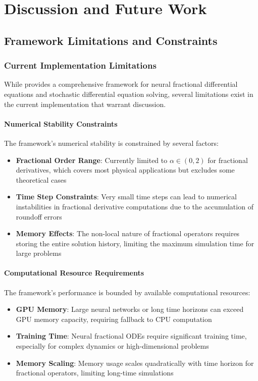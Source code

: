 \section{Discussion and Future Work}

\subsection{Framework Limitations and Constraints}

\subsubsection{Current Implementation Limitations}

While \hpfracc provides a comprehensive framework for neural fractional differential equations and stochastic differential equation solving, several limitations exist in the current implementation that warrant discussion.

\paragraph{Numerical Stability Constraints}
The framework's numerical stability is constrained by several factors:

\begin{itemize}
    \item \textbf{Fractional Order Range}: Currently limited to $\alpha \in (0, 2)$ for fractional derivatives, which covers most physical applications but excludes some theoretical cases
    \item \textbf{Time Step Constraints}: Very small time steps can lead to numerical instabilities in fractional derivative computations due to the accumulation of roundoff errors
    \item \textbf{Memory Effects}: The non-local nature of fractional operators requires storing the entire solution history, limiting the maximum simulation time for large problems
\end{itemize}

\paragraph{Computational Resource Requirements}
The framework's performance is bounded by available computational resources:

\begin{itemize}
    \item \textbf{GPU Memory}: Large neural networks or long time horizons can exceed GPU memory capacity, requiring fallback to CPU computation
    \item \textbf{Training Time}: Neural fractional ODEs require significant training time, especially for complex dynamics or high-dimensional problems
    \item \textbf{Memory Scaling}: Memory usage scales quadratically with time horizon for fractional operators, limiting long-time simulations
\end{itemize}

